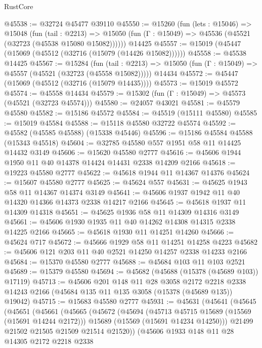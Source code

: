 \begin{lexlean}{RustCore}
\begin{coremodule}
@45538 := @32724 @45477 @39110
@45550 := @15260
    (fun (lets : @15046) =>
    @15048
      (fun (tail : @2213) =>
      @15050 (fun (Γ : @15049) => @45536 (@45521 (@32723 (@45538 @15080 @15082))))))
    @14425
@45557 := @15019 (@45447 (@15069 (@45512 (@32716 (@15079 (@14426 @15082))))))
@45558 := @45538 @14425
@45567 := @15284
    (fun (tail : @2213) => @15050 (fun (Γ : @15049) => @45557 (@45521 (@32723 (@45558 @15082)))))
    @14434
@45572 := @45447 (@15069 (@45512 (@32716 (@15079 @14435))))
@45573 := @15019 @45572
@45574 := @45558 @14434
@45579 := @15302 (fun (Γ : @15049) => @45573 (@45521 (@32723 @45574)))
@45580 := @24057 @43021
@45581 := @45579 @45580
@45582 := @15186 @45572
@45584 := @45519 (@15111 @45580)
@45585 := @15019 @45584
@45588 := @15118 @45580 @32722 @45574
@45592 := @45582 (@45585 @45588) (@15338 @45446)
@45596 := @15186 @45584 @45588 (@15343 @45518)
@45604 := @32785 @45580 @557 @1951 @58 @11 @14425 @14432 @3149
@45606 := @15620 @45580 @2777
@45616 := @45606 @1944 @1950 @11 @40 @14378 @14424 @14431 @2338 @14209 @2166
@45618 := @19223 @45580 @2777
@45622 := @45618 @1944 @11 @14367 @14376
@45624 := @15607 @45580 @2777
@45625 := @45624 @557
@45631 := @45625 @1943 @58 @11 @14367 @14374 @3149
@45641 := @45606 @1937 @1942 @11 @40 @14320 @14366 @14373 @2338 @14217 @2166
@45645 := @45618 @1937 @11 @14309 @14318
@45651 := @45625 @1936 @58 @11 @14309 @14316 @3149
@45661 := @45606 @1930 @1935 @11 @40 @14262 @14308 @14315 @2338 @14225 @2166
@45665 := @45618 @1930 @11 @14251 @14260
@45666 := @45624 @717
@45672 := @45666 @1929 @58 @11 @14251 @14258 @4223
@45682 := @45606 @121 @203 @11 @40 @2521 @14250 @14257 @2338 @14233 @2166
@45684 := @15370 @45580 @2777
@45688 := @45684 @103 @11 @103 @2521
@45689 := @15379 @45580
@45694 := @45682 (@45688 (@15378 (@45689 @103)) @17119)
@45713 := @45606
    @201
    @148
    @11
    @28
    @3058
    @2172
    @2218
    @2338
    @14243
    @2166
    (@45684 @135 @11 @135 @3058 (@15378 (@45689 @135)) @19042)
@45715 := @15683 @45580 @2777
@45931 := @45631
    (@45641
      (@45645
        (@45651
          (@45661
            (@45665
              (@45672
                (@45694
                  (@45713 @45715 @15689 (@15569 (@15691 @14244 @2172)))
                  @15689
                  (@15569 (@15691 @14234 @14250)))
                @21499
                @21502
                @21505
                @21509
                @21514
                @21520))
            (@45606
              @1933
              @148
              @11
              @28
              @14305
              @2172
              @2218
              @2338

\end{coremodule}
\end{lexlean}
